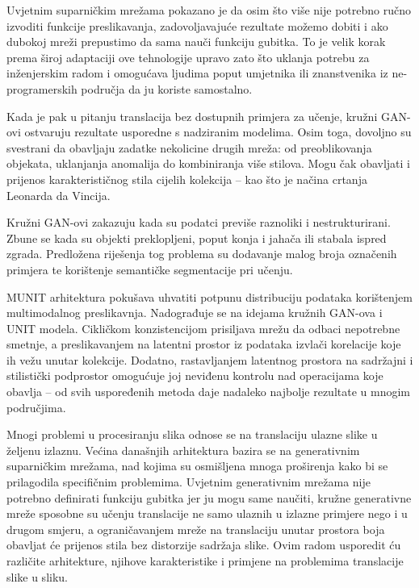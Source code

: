 \documentclass[lmodern, utf8, seminar]{fer}
\begin{document}
Uvjetnim suparničkim mrežama pokazano je da osim što više nije potrebno ručno izvoditi funkcije preslikavanja, zadovoljavajuće rezultate možemo dobiti i ako dubokoj mreži prepustimo da sama nauči funkciju gubitka. To je velik korak prema široj adaptaciji ove tehnologije upravo zato što uklanja potrebu za inženjerskim radom i omogućava ljudima poput umjetnika ili znanstvenika iz ne-programerskih područja da ju koriste samostalno.
\newline

Kada je pak u pitanju translacija bez dostupnih primjera za učenje, kružni GAN-ovi ostvaruju rezultate usporedne s nadziranim modelima. Osim toga, dovoljno su svestrani da obavljaju zadatke nekolicine drugih mreža: od preoblikovanja objekata, uklanjanja anomalija do kombiniranja više stilova. Mogu čak obavljati i prijenos karakterističnog stila cijelih kolekcija -- kao što je načina crtanja Leonarda da Vincija. 

Kružni GAN-ovi zakazuju kada su podatci previše raznoliki i nestrukturirani. Zbune se kada su objekti preklopljeni, poput konja i jahača ili stabala ispred zgrada. Predložena riješenja tog problema su dodavanje malog broja označenih primjera te korištenje semantičke segmentacije pri učenju. 


\newpage
MUNIT arhitektura pokušava uhvatiti potpunu distribuciju podataka korištenjem multimodalnog preslikavnja. Nadograđuje se na idejama kružnih GAN-ova i UNIT modela. Cikličkom konzistencijom prisiljava mrežu da odbaci nepotrebne smetnje, a preslikavanjem na latentni prostor iz podataka izvlači korelacije koje ih vežu unutar kolekcije. Dodatno, rastavljanjem latentnog prostora na sadržajni i stilistički podprostor omogućuje joj neviđenu kontrolu nad operacijama koje obavlja -- od svih uspoređenih metoda daje nadaleko najbolje rezultate u mnogim područjima.






\begin{sazetak}
Mnogi problemi u procesiranju slika odnose se na translaciju ulazne slike u željenu izlaznu. Većina današnjih arhitektura bazira se na generativnim suparničkim mrežama, nad kojima su osmišljena mnoga proširenja kako bi se prilagodila specifičnim problemima. Uvjetnim generativnim mrežama nije potrebno definirati funkciju gubitka jer ju mogu same naučiti, kružne generativne mreže sposobne su učenju translacije ne samo ulaznih u izlazne primjere nego i u drugom smjeru, a ograničavanjem mreže na translaciju unutar prostora boja obavljat će prijenos stila bez distorzije sadržaja slike. Ovim radom usporedit ću različite arhitekture, njihove karakteristike i primjene na problemima translacije slike u sliku.

\end{sazetak}
\end{document}
